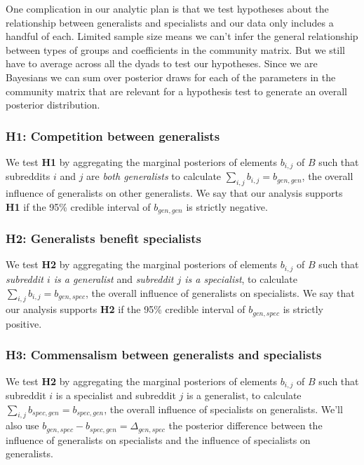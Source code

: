 \documentclass[12pt]{memoir}
\begin{document}
One complication in our analytic plan is that we test hypotheses about the relationship between generalists and specialists and our data only includes a handful of each.  Limited sample size means we can't infer the general relationship between types of groups and coefficients in the community matrix.  But we still have to average across all the dyads to test our hypotheses. Since we are Bayesians we can sum over posterior draws for each of the parameters in the community matrix that are relevant for a hypothesis test to generate an overall posterior distribution.

\subsubsection{\textbf{H1:} Competition between generalists}

We test \textbf{H1} by aggregating the marginal posteriors of elements $b_{i,j}$ of $B$ such that subreddits $i$ and $j$ are \emph{both generalists} to calculate $\sum_{i,j}{b_{i,j}}=b_{gen,gen}$, the overall influence of generalists on other generalists. We say that our analysis supports \textbf{H1} if the 95\% credible interval of $b_{gen,gen}$ is strictly negative.


\subsubsection{\textbf{H2:} Generalists benefit specialists}

We test \textbf{H2} by aggregating the marginal posteriors of elements $b_{i,j}$ of $B$ such that \emph{subreddit $i$ is a generalist} and \emph{subreddit $j$  is a specialist}, to calculate $\sum_{i,j}{b_{i,j}} = b_{gen,spec}$, the overall influence of generalists on specialists. We say that our analysis supports \textbf{H2} if the 95\% credible interval of $b_{gen,spec}$ is strictly positive.


\subsubsection{\textbf{H3:} Commensalism between generalists and specialists}

We test \textbf{H2} by aggregating the marginal posteriors of elements $b_{i,j}$ of $B$ such that subreddit $i$ is a specialist and subreddit $j$  is a generalist, to calculate $\sum_{i,j}{b_{spec,gen}}= b_{spec,gen}$, the overall influence of specialists on generalists.  We'll also use $b_{gen,spec} - b_{spec,gen} = \Delta_{gen,spec}$ the posterior difference between the influence of generalists on specialists and the influence of specialists on generalists. 
\end{document}
